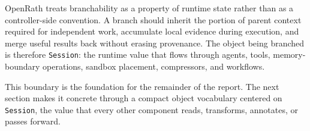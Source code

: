 OpenRath treats branchability as a property of runtime state rather than as a controller-side convention. A branch should inherit the portion of parent context required for independent work, accumulate local evidence during execution, and merge useful results back without erasing provenance. The object being branched is therefore \texttt{Session}: the runtime value that flows through agents, tools, memory-boundary operations, sandbox placement, compressors, and workflows.

This boundary is the foundation for the remainder of the report. The next section makes it concrete through a compact object vocabulary centered on \texttt{Session}, the value that every other component reads, transforms, annotates, or passes forward.

